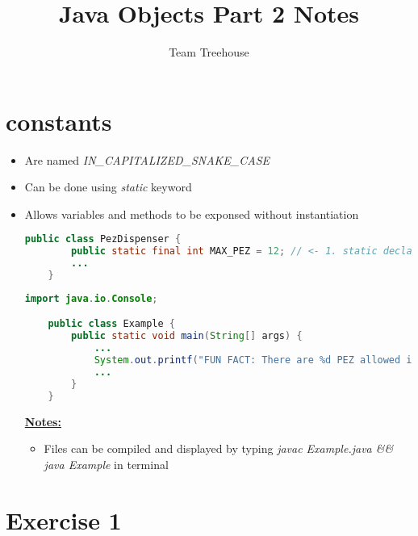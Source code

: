 \documentclass[12pt]{article}
\begin{document}
\title{Java Objects Part 2 Notes}
\author{Team Treehouse}
\maketitle

\bigskip

\section{constants}

\bigskip

\begin{itemize}
    \item Are named \textit{IN\_CAPITALIZED\_SNAKE\_CASE}
    \item Can be done using \textit{static} keyword
    \item Allows variables and methods to be exponsed without instantiation

    \begin{lstlisting}[language=Java,caption={lesson\_1/PezDispenser.java}]
    public class PezDispenser {
        public static final int MAX_PEZ = 12; // <- 1. static declared here :)
        ...
    }
    \end{lstlisting}

    \begin{lstlisting}[language=Java,caption={lesson\_1/Example.java}]
    import java.io.Console;

    public class Example {
        public static void main(String[] args) {
            ...
            System.out.printf("FUN FACT: There are %d PEZ allowed in every dispenser\n", PezDispenser.MAX_PEZ); // 2. <- And is used here :)
            ...
        }
    }
    \end{lstlisting}

    \bigskip

    \underline{\textbf{Notes:}}

    \bigskip

    \begin{itemize}
        \item Files can be compiled and displayed by typing \textit{javac Example.java \&\& java Example}
        in terminal
    \end{itemize}
\end{itemize}

\bigskip

\section{Exercise 1}
\end{document}
